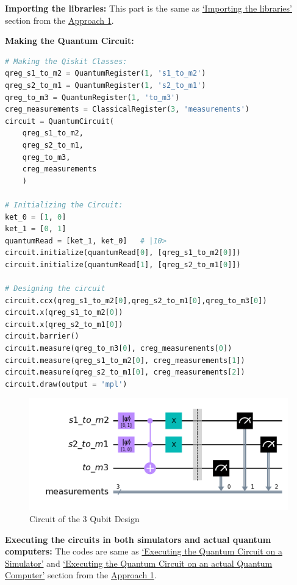 \textbf{Importing the libraries:}
This part is the same as \hyperref[code:importing_the_libraries]{`Importing the libraries'} section from the \hyperref[solution:1]{Approach 1}.

\textbf{Making the Quantum Circuit:}
\begin{lstlisting}[language=Python]
# Making the Qiskit Classes:
qreg_s1_to_m2 = QuantumRegister(1, 's1_to_m2')
qreg_s2_to_m1 = QuantumRegister(1, 's2_to_m1')
qreg_to_m3 = QuantumRegister(1, 'to_m3')
creg_measurements = ClassicalRegister(3, 'measurements')
circuit = QuantumCircuit(
	qreg_s1_to_m2,
	qreg_s2_to_m1,
	qreg_to_m3,
	creg_measurements
	)

# Initializing the Circuit:
ket_0 = [1, 0]
ket_1 = [0, 1]
quantumRead = [ket_1, ket_0]   # |10>
circuit.initialize(quantumRead[0], [qreg_s1_to_m2[0]])
circuit.initialize(quantumRead[1], [qreg_s2_to_m1[0]])

# Designing the circuit
circuit.ccx(qreg_s1_to_m2[0],qreg_s2_to_m1[0],qreg_to_m3[0])
circuit.x(qreg_s1_to_m2[0])
circuit.x(qreg_s2_to_m1[0])
circuit.barrier()
circuit.measure(qreg_to_m3[0], creg_measurements[0])
circuit.measure(qreg_s1_to_m2[0], creg_measurements[1])
circuit.measure(qreg_s2_to_m1[0], creg_measurements[2])
circuit.draw(output = 'mpl')\end{lstlisting}

\begin{figure}[h]%
	\includegraphics[width=0.85\linewidth]{./images/3qubit_qc.png}
	\caption{Circuit of the 3 Qubit Design}%
	\label{fig:3qubit_qc}%
\end{figure}

\textbf{Executing the circuits in both simulators and actual quantum computers:}
The codes are same as \hyperref[code:executing_the_quantum_circuit_on_a_simulator]{`Executing the Quantum Circuit on a Simulator'} and \hyperref[code:executing_the_quantum_circuit_on_a_quantum_computer]{`Executing the Quantum Circuit on an actual Quantum Computer'} section from the \hyperref[solution:1]{Approach 1}.

